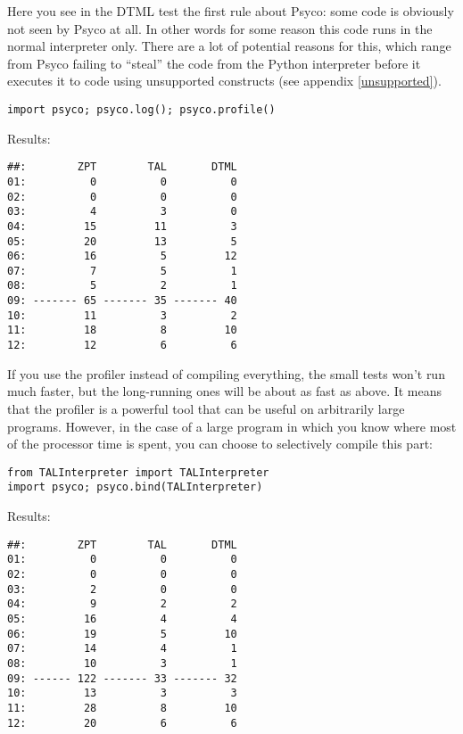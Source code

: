 \documentclass{manual}
\begin{document}
Here you see in the DTML test the first rule about Psyco: some code is obviously not seen by Psyco at all.  In other words for some reason this code runs in the normal interpreter only.  There are a lot of potential reasons for this, which range from Psyco failing to ``steal'' the code from the Python interpreter before it executes it to code using unsupported constructs (see appendix \ref{unsupported}).

\begin{verbatim}
import psyco; psyco.log(); psyco.profile()
\end{verbatim}

Results:

\begin{verbatim}
##:        ZPT        TAL       DTML
01:          0          0          0
02:          0          0          0
03:          4          3          0
04:         15         11          3
05:         20         13          5
06:         16          5         12
07:          7          5          1
08:          5          2          1
09: ------- 65 ------- 35 ------- 40
10:         11          3          2
11:         18          8         10
12:         12          6          6
\end{verbatim}

If you use the profiler instead of compiling everything, the small tests won't run much faster, but the long-running ones will be about as fast as above.  It means that the profiler is a powerful tool that can be useful on arbitrarily large programs.  However, in the case of a large program in which you know where most of the processor time is spent, you can choose to selectively compile this part:

\begin{verbatim}
from TALInterpreter import TALInterpreter
import psyco; psyco.bind(TALInterpreter)
\end{verbatim}

Results:

\begin{verbatim}
##:        ZPT        TAL       DTML
01:          0          0          0
02:          0          0          0
03:          2          0          0
04:          9          2          2
05:         16          4          4
06:         19          5         10
07:         14          4          1
08:         10          3          1
09: ------ 122 ------- 33 ------- 32
10:         13          3          3
11:         28          8         10
12:         20          6          6
\end{verbatim}
\end{document}
